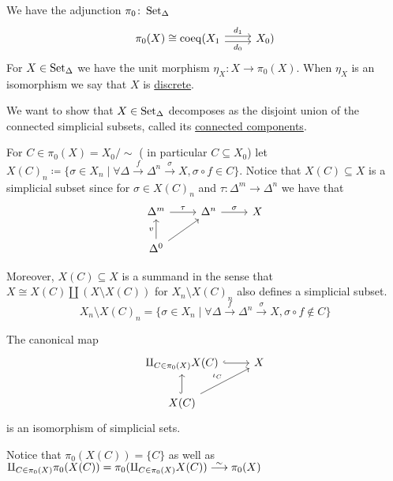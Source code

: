 We have the adjunction $\pi_0 \colon \operatorname{Set}_{\Delta}$
\[
\begin{tikzcd}
    \pi_0(X)\cong \coeq(X_1
    \arrow[r, shift left, "d_1"]
    \arrow[r, shift right, "d_0"']
    &
    X_0)
\end{tikzcd}
\]
For $X \in \operatorname{Set}_{\Delta}$ we have the unit morphism $\eta_X \colon X \to \pi_0(X)$.
When $\eta_X$ is an isomorphism we say that $X$ is \underline{discrete}.



We want to show that $X \in  \operatorname{Set}_{\Delta}$ decomposes as the disjoint union of the connected simplicial subsets, called its \underline{connected components}.

\begin{construction}
    For $C \in  \pi_0(X)=X_0/\sim$ ( in particular $C \subseteq X_0$) let $X(C)_n \coloneqq \{ \sigma  \in X_n \mid \forall \Delta \xrightarrow{f}\Delta^n \xrightarrow{\sigma}X , \sigma \circ f\in C\}$.
    Notice that $X(C) \subseteq X$ is a simplicial subset since for $\sigma  \in X(C)_n$ and $\tau \colon \Delta^m \to \Delta^n$ we have that 
    \[
    \begin{tikzcd}
        \Delta^m
        \arrow[r,"\tau"]
        &
        \Delta^n
        \arrow[r,"\sigma"]
        &
        X
        \\
        \Delta^0
        \arrow[u,"v"]
        \arrow[ru]
    \end{tikzcd}    
    \]
\end{construction}

Moreover, $X(C) \subseteq X$ is a summand in the sense that $X \cong X(C) \amalg (X \setminus X(C))$ for $X_n \setminus X(C)_n$ also defines a simplicial subset.
\[
X_n\setminus X(C)_n =\{ \sigma  \in X_n \mid \forall \Delta \xrightarrow{f}\Delta^n \xrightarrow{\sigma}X,\sigma\circ f \notin C\}
\]

\begin{prop}
    The canonical map 
    \[
    \begin{tikzcd}
        \amalg_{C \in \pi_0(X)}X(C)
        \arrow[r, hook]
        &
        X
        \\
        X(C)
        \arrow[u, hook]
        \arrow[ru, "\iota_C"]
    \end{tikzcd}
    \]
    is an isomorphism of simplicial sets.
\end{prop}

\begin{rmk}
    Notice that
    $\pi_0(X(C))=\{C\}$ as well as 
    $\amalg_{C \in \pi_0(X)}\pi_0(X(C))
    =\pi_0(\amalg_{C \in \pi_0(X)}X(C)) 
    \isomorphism 
    \pi_0(X)$
\end{rmk}

